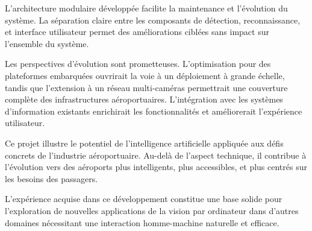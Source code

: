 \documentclass[12pt,a4paper]{article}
\begin{document}
L'architecture modulaire développée facilite la maintenance et l'évolution du système. La séparation claire entre les composants de détection, reconnaissance, et interface utilisateur permet des améliorations ciblées sans impact sur l'ensemble du système.

Les perspectives d'évolution sont prometteuses. L'optimisation pour des plateformes embarquées ouvrirait la voie à un déploiement à grande échelle, tandis que l'extension à un réseau multi-caméras permettrait une couverture complète des infrastructures aéroportuaires. L'intégration avec les systèmes d'information existants enrichirait les fonctionnalités et améliorerait l'expérience utilisateur.

Ce projet illustre le potentiel de l'intelligence artificielle appliquée aux défis concrets de l'industrie aéroportuaire. Au-delà de l'aspect technique, il contribue à l'évolution vers des aéroports plus intelligents, plus accessibles, et plus centrés sur les besoins des passagers.

L'expérience acquise dans ce développement constitue une base solide pour l'exploration de nouvelles applications de la vision par ordinateur dans d'autres domaines nécessitant une interaction homme-machine naturelle et efficace.

\newpage
\end{document}
